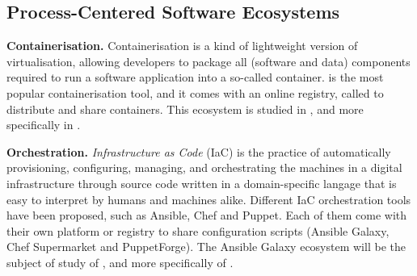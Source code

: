 \subsection{Process-Centered Software Ecosystems}


\textbf{Containerisation.} Containerisation is a kind of lightweight version of virtualisation, allowing developers to package all (software and data) components required to run a software application into a so-called container.
\docker is the most popular containerisation tool, and it comes with an online registry, called \dockerhub to distribute and share containers. This
\dockerhub ecosystem is studied in , and more specifically in .

\textbf{Orchestration.} \emph{Infrastructure as Code} (IaC) is the practice of automatically provisioning, configuring, managing, and orchestrating the machines in a digital infrastructure through source code written in a domain-specific langage that is easy to interpret by humans and machines alike.
Different IaC orchestration tools have been proposed, such as Ansible, Chef and Puppet. Each of them come with their own platform or registry to share configuration scripts (Ansible Galaxy, Chef Supermarket and PuppetForge).
The Ansible Galaxy ecosystem will be the subject of study of , and more specifically of .

